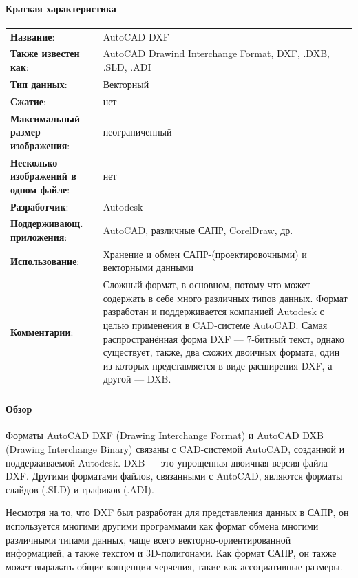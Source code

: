 \paragraph{Краткая характеристика}

\begin{longtable}{p{110pt} p{340pt}}
	\label{tab:dxf}
	\centering
	\textbf{Название}:&AutoCAD DXF\\
	\textbf{Также известен как}:&AutoCAD Drawind Interchange Format, DXF, .DXB, .SLD, .ADI\\
	\textbf{Тип данных}:&Векторный\\
	\textbf{Сжатие}:&нет\\
	\textbf{Максимальный размер изображения}:&неограниченный\\
	\textbf{Несколько изображений в одном файле}:&нет\\
	\textbf{Разработчик}:&Autodesk\\
	\textbf{Поддерживающ. приложения}:&AutoCAD, различные САПР, CorelDraw, др.\\
	\textbf{Использование}:&Хранение и обмен САПР-(проектировочными) и векторными данными\\
	\textbf{Комментарии}:&Сложный формат, в основном, потому что может содержать в себе много различных типов данных. Формат разработан и поддерживается компанией Autodesk с целью применения в CAD-системе AutoCAD. Самая распространённая форма DXF --- 7-битный текст, однако существует, также, два схожих двоичных формата, один из которых представляется в виде расширения DXF, а другой --- DXB.\\
\end{longtable}

\paragraph{Обзор}

Форматы AutoCAD DXF (Drawing Interchange Format) и AutoCAD DXB (Drawing Interchange Binary) связаны с CAD-системой AutoCAD, созданной и поддерживаемой Autodesk. DXB — это упрощенная двоичная версия файла DXF. Другими форматами файлов, связанными с AutoCAD, являются форматы слайдов (.SLD) и графиков (.ADI).

Несмотря на то, что DXF был разработан для представления данных в САПР, он используется многими другими программами как формат обмена многими различными типами данных, чаще всего векторно-ориентированной информацией, а также текстом и 3D-полигонами. Как формат САПР, он также может выражать общие концепции черчения, такие как ассоциативные размеры.

